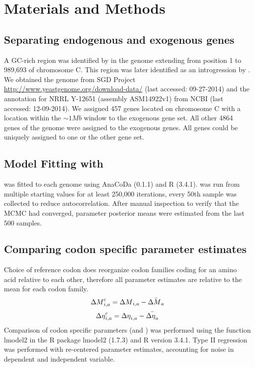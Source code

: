 \documentclass[12pt]{article}
\begin{document}
\section*{Materials and Methods}

\subsection*{Separating endogenous and exogenous genes}
A GC-rich region was identified by \citet{payen2009} in the \kluyveri genome extending from position 1 to 989,693 of chromosome C.
This region was later identified as an introgression by \citet{friedrich2015}.
We obtained the \kluyveri genome from SGD Project \url{http://www.yeastgenome.org/download-data/} (last accessed: 09-27-2014) and the annotation for \kluyveri NRRL Y-12651 (assembly ASM14922v1) from NCBI (last accessed: 12-09-2014).
We assigned 457 genes located on chromosome C with a location within the $\sim 1 Mb$ window to the exogenous gene set.
All other 4864 genes of the \kluyveri genome were assigned to the exogenous genes.
All genes could be uniquely assigned to one or the other gene set.

\subsection*{Model Fitting with \ROC}
\ROC was fitted to each genome using AnaCoDa (0.1.1) \citep{landerer2018} and R (3.4.1).
\ROC was run from multiple starting values for at least 250,000 iterations, every 50th sample was collected to reduce autocorrelation. 
After manual inspection to verify that the MCMC had converged, parameter posterior means were estimated from the last 500 samples.

\subsection*{Comparing codon specific parameter estimates}
Choice of reference codon does reorganize codon families coding for an amino acid relative to each other, therefore all parameter estimates are relative to the mean for each codon family.
\begin{equation}
{\Delta M}_{i,a}^c = {\Delta M}_{i,a} - \bar{{\Delta M}_a}
\end{equation}
\begin{equation}
{\Delta \eta}_{i,a}^c = {\Delta \eta}_{i,a} - \bar{{\Delta \eta}_a}
\end{equation}
Comparison of codon specific parameters (\DM and \DE) was performed using the function lmodel2 in the R package lmodel2 (1.7.3) and R version 3.4.1.
Type II regression was performed with re-centered parameter estimates, accounting for noise in dependent and independent variable.
\end{document}

